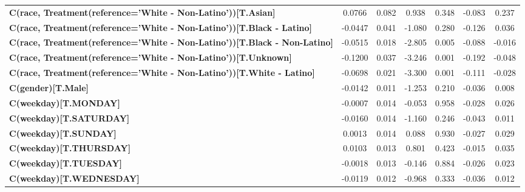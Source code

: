 \begin{center}
\begin{tabular}{lcccccc}
\textbf{C(race, Treatment(reference='White - Non-Latino'))[T.Asian]}              &       0.0766  &        0.082     &     0.938  &         0.348        &       -0.083    &        0.237     \\
\textbf{C(race, Treatment(reference='White - Non-Latino'))[T.Black - Latino]}     &      -0.0447  &        0.041     &    -1.080  &         0.280        &       -0.126    &        0.036     \\
\textbf{C(race, Treatment(reference='White - Non-Latino'))[T.Black - Non-Latino]} &      -0.0515  &        0.018     &    -2.805  &         0.005        &       -0.088    &       -0.016     \\
\textbf{C(race, Treatment(reference='White - Non-Latino'))[T.Unknown]}            &      -0.1200  &        0.037     &    -3.246  &         0.001        &       -0.192    &       -0.048     \\
\textbf{C(race, Treatment(reference='White - Non-Latino'))[T.White - Latino]}     &      -0.0698  &        0.021     &    -3.300  &         0.001        &       -0.111    &       -0.028     \\
\textbf{C(gender)[T.Male]}                                                        &      -0.0142  &        0.011     &    -1.253  &         0.210        &       -0.036    &        0.008     \\
\textbf{C(weekday)[T.MONDAY]}                                                     &      -0.0007  &        0.014     &    -0.053  &         0.958        &       -0.028    &        0.026     \\
\textbf{C(weekday)[T.SATURDAY]}                                                   &      -0.0160  &        0.014     &    -1.160  &         0.246        &       -0.043    &        0.011     \\
\textbf{C(weekday)[T.SUNDAY]}                                                     &       0.0013  &        0.014     &     0.088  &         0.930        &       -0.027    &        0.029     \\
\textbf{C(weekday)[T.THURSDAY]}                                                   &       0.0103  &        0.013     &     0.801  &         0.423        &       -0.015    &        0.035     \\
\textbf{C(weekday)[T.TUESDAY]}                                                    &      -0.0018  &        0.013     &    -0.146  &         0.884        &       -0.026    &        0.023     \\
\textbf{C(weekday)[T.WEDNESDAY]}                                                  &      -0.0119  &        0.012     &    -0.968  &         0.333        &       -0.036    &        0.012     \\

\end{tabular}
\end{center}
